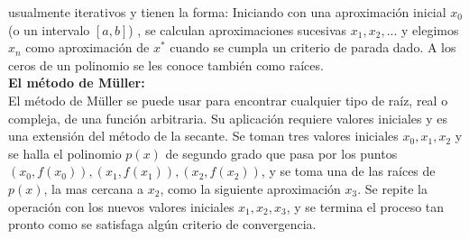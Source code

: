 \documentclass[12pt]{article}
\begin{document}
			usualmente iterativos y tienen la forma: Iniciando con una aproximación inicial $ x_0 $ (o un intervalo $ [a,b] $) , 
			se calculan aproximaciones sucesivas $ x_1,x_2,... $ y elegimos $ x_n $ como aproximación de $ x^* $ cuando se cumpla un 
			criterio de parada dado. A los ceros de un polinomio se les conoce también como raíces.\\
			\textbf{El método de Müller:}\\
			El método de Müller se puede usar para encontrar cualquier tipo de raíz, real o compleja, de una 
			función arbitraria. Su aplicación requiere valores iniciales y es una extensión del método de la 
			secante. Se toman tres valores iniciales $ x_0, x_1, x_2 $ y se halla el polinomio $ p(x) $ de 
			segundo grado que pasa por los puntos $ (x_0,f(x_0)), (x_1,f(x_1)),(x_2,f(x_2)) $, y se toma una 
			de las raíces de $ p(x) $, la mas cercana a $ x_2 $, como la siguiente aproximación $ x_3 $. Se 
			repite la operación con los nuevos valores iniciales $ x_1, x_2, x_3 $, y se termina el proceso 
			tan pronto como se satisfaga algún criterio de convergencia.\cite{bib:item3}
\end{document}
